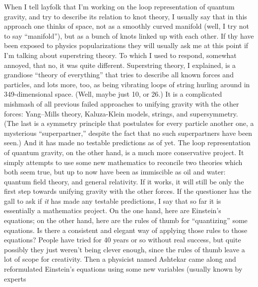 \documentclass[12pt]{article}
\def\tightlist{}
\renewcommand{\texttt}[1]{%
  \begingroup
  \ttfamily
  \begingroup\lccode`~=`/\lowercase{\endgroup\def~}{/\discretionary{}{}{}}%
  \begingroup\lccode`~=`[\lowercase{\endgroup\def~}{[\discretionary{}{}{}}%
  \begingroup\lccode`~=`.\lowercase{\endgroup\def~}{.\discretionary{}{}{}}%
  \catcode`/=\active\catcode`[=\active\catcode`.=\active
  \scantokens{#1\noexpand}%
  \endgroup
}
\begin{document}
\noindent
When I tell layfolk that I'm working on the loop representation of
quantum gravity, and try to describe its relation to knot theory, I
usually say that in this approach one thinks of space, not as a smoothly
curved manifold (well, I try not to say ``manifold''), but as a bunch of
knots linked up with each other. If thy have been exposed to physics
popularizations they will usually ask me at this point if I'm talking
about superstring theory. To which I used to respond, somewhat annoyed,
that no, it was quite different. Superstring theory, I explained, is a
grandiose ``theory of everything'' that tries to describe all known
forces and particles, and lots more, too, as being vibrating loops of
string hurling around in 349-dimensional space. (Well, maybe just 10, or
26.) It is a complicated mishmash of all previous failed approaches to
unifying gravity with the other forces: Yang--Mills theory, Kaluza-Klein
models, strings, and supersymmetry. (The last is a symmetry principle
that postulates for every particle another one, a mysterious
``superpartner,'' despite the fact that no such superpartners have been
seen.) And it has made no testable predictions as of yet. The loop
representation of quantum gravity, on the other hand, is a much more
conservative project. It simply attempts to use some new mathematics to
reconcile two theories which both seem true, but up to now have been as
immiscible as oil and water: quantum field theory, and general
relativity. If it works, it will still be only the first step towards
unifying gravity with the other forces. If the questioner has the gall
to ask if \emph{it} has made any testable predictions, I say that so far
it is essentially a mathematics project. On the one hand, here are
Einstein's equations; on the other hand, here are the rules of thumb for
``quantizing'' some equations. Is there a consistent and elegant way of
applying those rules to those equations? People have tried for 40 years
or so without real success, but quite possibly they just weren't being
clever enough, since the rules of thumb leave a lot of scope for
creativity. Then a physicist named Ashtekar came along and reformulated
Einstein's equations using some new variables (usually known by experts
\end{document}
